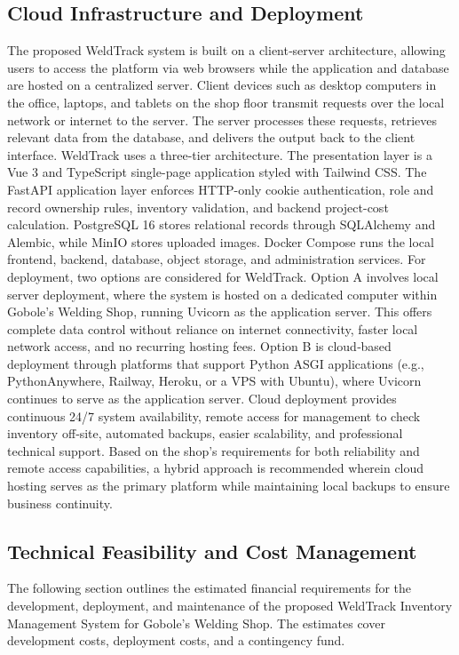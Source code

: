 \documentclass[12pt, letterpaper]{article}
\begin{document}
\subsection{Cloud Infrastructure and Deployment}
\hspace*{2em} The proposed WeldTrack system is built on a client‑server architecture, allowing users to access the platform via web browsers while the application and database are hosted on a centralized server. Client devices such as desktop computers in the office, laptops, and tablets on the shop floor transmit requests over the local network or internet to the server. The server processes these requests, retrieves relevant data from the database, and delivers the output back to the client interface.
\hspace*{2em} WeldTrack uses a three-tier architecture. The presentation layer is a Vue 3 and TypeScript single-page application styled with Tailwind CSS. The FastAPI application layer enforces HTTP-only cookie authentication, role and record ownership rules, inventory validation, and backend project-cost calculation. PostgreSQL 16 stores relational records through SQLAlchemy and Alembic, while MinIO stores uploaded images. Docker Compose runs the local frontend, backend, database, object storage, and administration services.
\hspace*{2em} For deployment, two options are considered for WeldTrack. Option A involves local server deployment, where the system is hosted on a dedicated computer within Gobole’s Welding Shop, running Uvicorn as the application server. This offers complete data control without reliance on internet connectivity, faster local network access, and no recurring hosting fees. Option B is cloud‑based deployment through platforms that support Python ASGI applications (e.g., PythonAnywhere, Railway, Heroku, or a VPS with Ubuntu), where Uvicorn continues to serve as the application server. Cloud deployment provides continuous 24/7 system availability, remote access for management to check inventory off‑site, automated backups, easier scalability, and professional technical support. Based on the shop’s requirements for both reliability and remote access capabilities, a hybrid approach is recommended wherein cloud hosting serves as the primary platform while maintaining local backups to ensure business continuity.

\subsection{Technical Feasibility and Cost Management}
\hspace*{2em} The following section outlines the estimated financial requirements for the development, deployment, and maintenance of the proposed WeldTrack Inventory Management System for Gobole's Welding Shop. The estimates cover development costs, deployment costs, and a contingency fund.
\end{document}
